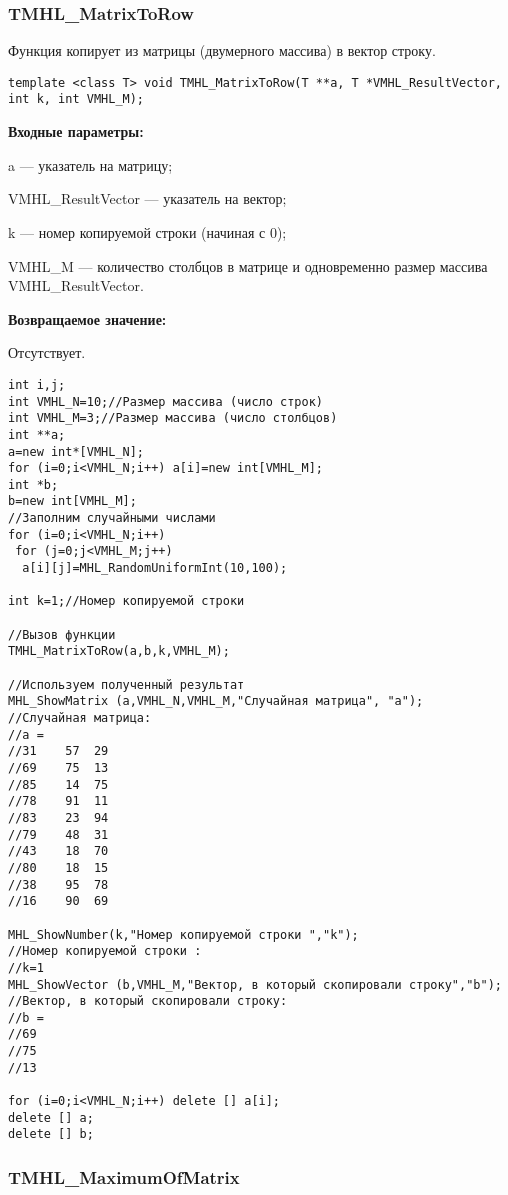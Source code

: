 \documentclass[a4paper,12pt]{article}
\begin{document}
\subsubsection{TMHL\_MatrixToRow}\label{TMHL_MatrixToRow}

Функция копирует из матрицы (двумерного массива) в вектор строку.


\begin{lstlisting}[label=code_syntax_TMHL_MatrixToRow,caption=Синтаксис]
template <class T> void TMHL_MatrixToRow(T **a, T *VMHL_ResultVector, int k, int VMHL_M);
\end{lstlisting}

\textbf{Входные параметры:}  
 
a --- указатель на матрицу;
 
VMHL\_ResultVector --- указатель на вектор;
 
k --- номер копируемой строки (начиная с 0);
 
VMHL\_M --- количество столбцов в матрице и одновременно размер массива VMHL\_ResultVector.

\textbf{Возвращаемое значение:}

Отсутствует.


\begin{lstlisting}[label=code_use_TMHL_MatrixToRow,caption=Пример использования]
int i,j;
int VMHL_N=10;//Размер массива (число строк)
int VMHL_M=3;//Размер массива (число столбцов)
int **a;
a=new int*[VMHL_N];
for (i=0;i<VMHL_N;i++) a[i]=new int[VMHL_M];
int *b;
b=new int[VMHL_M];
//Заполним случайными числами
for (i=0;i<VMHL_N;i++)
 for (j=0;j<VMHL_M;j++)
  a[i][j]=MHL_RandomUniformInt(10,100);

int k=1;//Номер копируемой строки

//Вызов функции
TMHL_MatrixToRow(a,b,k,VMHL_M);

//Используем полученный результат
MHL_ShowMatrix (a,VMHL_N,VMHL_M,"Случайная матрица", "a");
//Случайная матрица:
//a =	
//31	57	29
//69	75	13
//85	14	75
//78	91	11
//83	23	94
//79	48	31
//43	18	70
//80	18	15
//38	95	78
//16	90	69

MHL_ShowNumber(k,"Номер копируемой строки ","k");
//Номер копируемой строки :
//k=1
MHL_ShowVector (b,VMHL_M,"Вектор, в который скопировали строку","b");
//Вектор, в который скопировали строку:
//b =	
//69
//75
//13

for (i=0;i<VMHL_N;i++) delete [] a[i];
delete [] a;
delete [] b;
\end{lstlisting}

\subsubsection{TMHL\_MaximumOfMatrix}\label{TMHL_MaximumOfMatrix}
\end{document}
